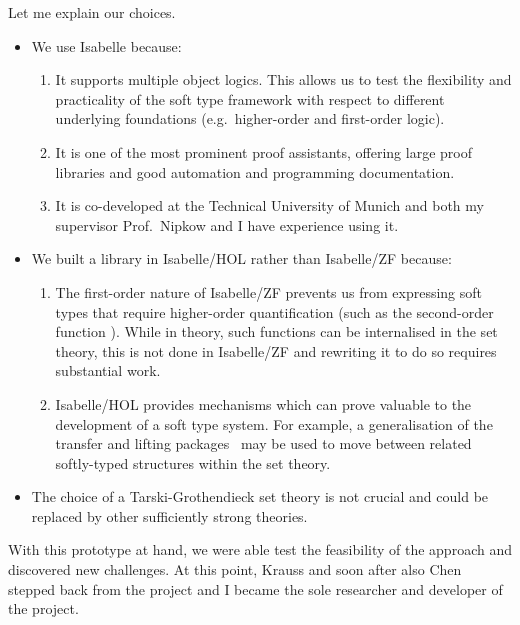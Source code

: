 \documentclass[a4paper, 12pt]{article}
\theoremstyle{plain}
\theoremstyle{definition}
\begin{document}
Let me explain our choices.
\begin{itemize}
  \item We use Isabelle because:
    \begin{enumerate}
      \item It supports multiple object logics.
        This allows us to test the flexibility and practicality of the soft type framework with respect to different underlying foundations (e.g.\ higher-order and first-order logic).
      \item It is one of the most prominent proof assistants, offering large proof libraries and good automation and programming documentation.
      \item It is co-developed at the Technical University of Munich and both my supervisor Prof.\ Nipkow and I have experience using it.
    \end{enumerate}
  \item We built a library in Isabelle/HOL rather than Isabelle/ZF because:
    \begin{enumerate}
      \item The first-order nature of Isabelle/ZF prevents us from expressing
        soft types that require higher-order quantification (such as the second-order function ).
    While in theory, such functions can be internalised in the set theory, this is not done in Isabelle/ZF and rewriting it to do so requires substantial work.
  \item Isabelle/HOL provides mechanisms which can prove valuable to the development of a soft type system.
    For example, a generalisation of the transfer and lifting packages~\cite{lifting} may be used to move between related softly-typed structures within the set theory.
    \end{enumerate}
  \item The choice of a Tarski-Grothendieck set theory is not crucial and could be replaced by other sufficiently strong theories.
\end{itemize}

With this prototype at hand,
we were able test the feasibility of the approach and discovered new challenges.
At this point, Krauss and soon after also Chen stepped
back from the project and I became the sole researcher and developer of the project.
\end{document}
